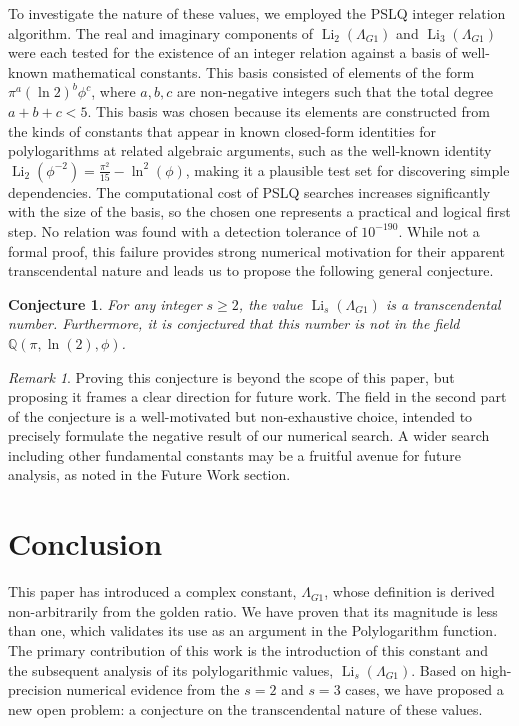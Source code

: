 \documentclass{amsart}
\theoremstyle{plain}
\newtheorem{conjecture}[theorem]{Conjecture}
\theoremstyle{definition}
\theoremstyle{remark}
\newtheorem*{remark}{Remark}
\DeclareMathOperator{\Li}{Li}
\newcommand{\LambdaG}{\Lambda_{G1}}
\newcommand{\phiG}{\phi}
\begin{document}
To investigate the nature of these values, we employed the PSLQ integer relation algorithm. The real and imaginary components of $\Li_2(\LambdaG)$ and $\Li_3(\LambdaG)$ were each tested for the existence of an integer relation against a basis of well-known mathematical constants. This basis consisted of elements of the form $\pi^a (\ln 2)^b \phiG^c$, where $a,b,c$ are non-negative integers such that the total degree $a+b+c < 5$. This basis was chosen because its elements are constructed from the kinds of constants that appear in known closed-form identities for polylogarithms at related algebraic arguments, such as the well-known identity $\Li_2(\phiG^{-2})=\frac{\pi^{2}}{15}-\ln^{2}(\phiG)$, making it a plausible test set for discovering simple dependencies. The computational cost of PSLQ searches increases significantly with the size of the basis, so the chosen one represents a practical and logical first step. No relation was found with a detection tolerance of $10^{-190}$. While not a formal proof, this failure provides strong numerical motivation for their apparent transcendental nature and leads us to propose the following general conjecture.

\begin{conjecture}
For any integer $s \ge 2$, the value $\Li_s(\LambdaG)$ is a transcendental number. Furthermore, it is conjectured that this number is not in the field $\mathbb{Q}(\pi, \ln(2), \phiG)$.
\end{conjecture}

\begin{remark}
Proving this conjecture is beyond the scope of this paper, but proposing it frames a clear direction for future work. The field in the second part of the conjecture is a well-motivated but non-exhaustive choice, intended to precisely formulate the negative result of our numerical search. A wider search including other fundamental constants may be a fruitful avenue for future analysis, as noted in the Future Work section.
\end{remark}

\section{Conclusion}
This paper has introduced a complex constant, $\LambdaG$, whose definition is derived non-arbitrarily from the golden ratio. We have proven that its magnitude is less than one, which validates its use as an argument in the Polylogarithm function. The primary contribution of this work is the introduction of this constant and the subsequent analysis of its polylogarithmic values, $\Li_s(\LambdaG)$. Based on high-precision numerical evidence from the $s=2$ and $s=3$ cases, we have proposed a new open problem: a conjecture on the transcendental nature of these values.
\end{document}
